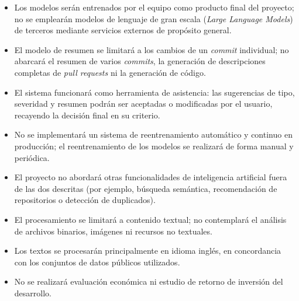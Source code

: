 \begin{itemize}
  \item Los modelos serán entrenados por el equipo como producto final del proyecto; no se emplearán modelos de lenguaje de gran escala (\textit{Large Language Models}) de terceros mediante servicios externos de propósito general.

  \item El modelo de resumen se limitará a los cambios de un \textit{commit} individual; no abarcará el resumen de varios \textit{commits}, la generación de descripciones completas de \textit{pull requests} ni la generación de código.

  \item El sistema funcionará como herramienta de asistencia: las sugerencias de tipo, severidad y resumen podrán ser aceptadas o modificadas por el usuario, recayendo la decisión final en su criterio.

  \item No se implementará un sistema de reentrenamiento automático y continuo en producción; el reentrenamiento de los modelos se realizará de forma manual y periódica.

  \item El proyecto no abordará otras funcionalidades de inteligencia artificial fuera de las dos descritas (por ejemplo, búsqueda semántica, recomendación de repositorios o detección de duplicados).

  \item El procesamiento se limitará a contenido textual; no contemplará el análisis de archivos binarios, imágenes ni recursos no textuales.

  \item Los textos se procesarán principalmente en idioma inglés, en concordancia con los conjuntos de datos públicos utilizados.

  \item No se realizará evaluación económica ni estudio de retorno de inversión del desarrollo.
\end{itemize}


